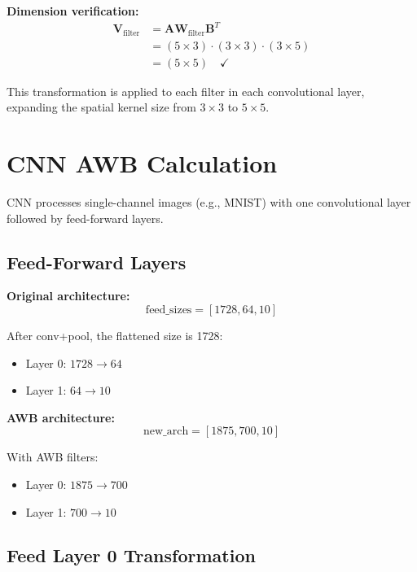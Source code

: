 \documentclass[11pt]{article}
\begin{document}
\textbf{Dimension verification:}
\begin{align}
\mathbf{V}_{\text{filter}} &= \mathbf{A} \mathbf{W}_{\text{filter}} \mathbf{B}^T \\
&= (5 \times 3) \cdot (3 \times 3) \cdot (3 \times 5) \\
&= (5 \times 5) \quad \checkmark
\end{align}

This transformation is applied to each filter in each convolutional layer, expanding the spatial kernel size from $3 \times 3$ to $5 \times 5$.

\newpage

\section{CNN AWB Calculation}

CNN processes single-channel images (e.g., MNIST) with one convolutional layer followed by feed-forward layers.

\subsection{Feed-Forward Layers}

\textbf{Original architecture:}
\begin{equation}
\text{feed\_sizes} = [1728, 64, 10]
\end{equation}

After conv+pool, the flattened size is 1728:
\begin{itemize}
    \item Layer 0: $1728 \rightarrow 64$
    \item Layer 1: $64 \rightarrow 10$
\end{itemize}

\textbf{AWB architecture:}
\begin{equation}
\text{new\_arch} = [1875, 700, 10]
\end{equation}

With AWB filters:
\begin{itemize}
    \item Layer 0: $1875 \rightarrow 700$
    \item Layer 1: $700 \rightarrow 10$
\end{itemize}

\subsection{Feed Layer 0 Transformation}
\end{document}
